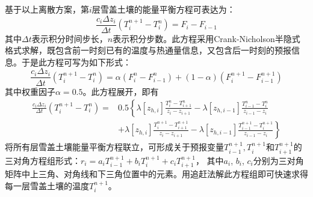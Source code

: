 基于以上离散方案，第$ i $层雪盖土壤的能量平衡方程可表达为：
\begin{equation}
\frac{c_{i} \Delta z_{i}}{\Delta t}\left(T_{i}^{n+1}-T_{i}^{n}\right)=F_{i}-F_{i-1}
\end{equation}
%
其中$\Delta t$表示积分时间步长，$n$表示积分步数。此方程采用Crank-Nicholson半隐式格式求解，既包含前一时刻已有的温度与热通量信息，又包含后一时刻的预报信息。于是此方程可写为如下形式：
\begin{equation}
\frac{c_{i} \Delta z_{i}}{\Delta t}\left(T_{i}^{n+1}-T_{i}^{n}\right)=\alpha\left(F_{i}^{n}-F_{i-1}^{n}\right)+(1-\alpha)\left(F_{i}^{n+1}-F_{i-1}^{n+1}\right)
\end{equation}
其中权重因子$\alpha=0.5$。此方程展开，即有
\begin{equation}
\begin{aligned} \frac{c_{i} \Delta z_{i}}{\Delta t}\left(T_{i}^{n+1}-T_{i}^{n}\right)=& 0.5\left\{\lambda\left[z_{h, i}\right] \frac{T_{i}^{n}-T_{i+1}^{n}}{z_{i}-z_{i+1}}-\lambda\left[z_{h, i-1}\right] \frac{T_{i-1}^{n}-T_{i}^{n}}{z_{i-1}-z_{i}}\right.\\ &\left.+\lambda\left[z_{h, i}\right] \frac{T_{i}^{n+1}-T_{i+1}^{n+1}}{z_{i}-z_{i+1}}-\lambda\left[z_{h, i-1}\right] \frac{T_{i-1}^{n+1}-T_{i}^{n+1}}{z_{i-1}-z_{i}}\right\} \end{aligned}
\end{equation}
将所有层雪盖土壤能量平衡方程联立，可形成关于预报变量$T_{i-1}^{n+1},T_i^{n+1}$和$T_{i+1}^{n+1}$的三对角方程组形式：$r_i=a_iT_{i-1}^{n+1}+b_iT_i^{n+1}+c_iT_{i+1}^{n+1}$，
其中$a_i$, $b_i$, $c_i$分别为三对角矩阵中上三角、对角线和下三角位置中的元素。用追赶法解此方程组即可快速求得每一层雪盖土壤的温度$T_i^{n+1}$。


